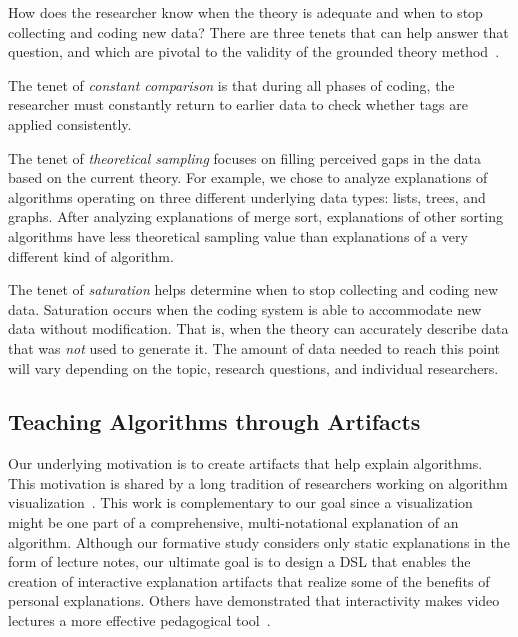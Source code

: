 \documentclass[sigconf]{acmart}
\begin{document}
How does the researcher know when the theory is adequate and when to stop
collecting and coding new data? There are three tenets that can help answer
that question, and which are pivotal to the validity of the grounded theory
method~\cite{Strauss67discoveryof}.
%
\begin{enumerate*}
%
\item The tenet of \emph{constant comparison} is that during all phases of
coding, the researcher must constantly return to earlier data to check whether
tags are applied consistently.
%
\item The tenet of \emph{theoretical sampling} focuses on filling perceived
gaps in the data based on the current theory. For example, we chose to analyze
explanations of algorithms operating on three different underlying data types:
lists, trees, and graphs. After analyzing explanations of merge sort,
explanations of other sorting algorithms have less theoretical sampling value
than explanations of a very different kind of algorithm.
%
\item The tenet of \emph{saturation} helps determine when to stop collecting
and coding new data. Saturation occurs when the coding system is able to
accommodate new data without modification. That is, when the theory can
accurately describe data that was \emph{not} used to generate it. The amount of
data needed to reach this point will vary depending on the topic, research
questions, and individual researchers.
%
\end{enumerate*}


\subsection{Teaching Algorithms through Artifacts}
\label{sec:back:rw}


Our underlying motivation is to create artifacts that help explain algorithms.
This motivation is shared by a long tradition of researchers working on
algorithm
visualization~\cite{Gloor92,Gloor97,HDS02,shaffer2010algorithm,HANSEN2002291,
Naps:2002:ERV:782941.782998,Grissom:2003:AVC:774833.774846,KANN1997223}.
%
This work is complementary to our goal since a visualization might be one part
of a comprehensive, multi-notational explanation of an algorithm.
%
%
Although our formative study considers only static explanations in the form of
lecture notes, our ultimate goal is to design a DSL that enables the creation
of interactive explanation artifacts that realize some of the benefits of
personal explanations. Others have demonstrated that interactivity makes video
lectures a more effective pedagogical
tool~\cite{Schwan2004293,Merkt2011687,zhang2005interactive}.
\end{document}
